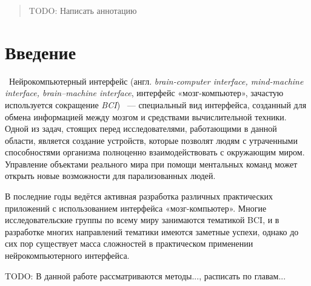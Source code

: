 \documentclass[12pt,fleqn]{article}
\begin{document}
\newpage
\renewcommand{\contentsname}{Содержание}
\tableofcontents

\newpage
\begin{abstract}
	TODO: Написать аннотацию

\end{abstract}

\newpage
\section{Введение}
	\quad\,\,\,Нейрокомпьютерный интерфейс (англ. {\it brain-computer interface, mind-machine interface, brain–machine interface}, интерфейс «мозг-компьютер», зачастую используется сокращение {\it BCI}) ~--- специальный вид интерфейса, созданный для обмена информацией между мозгом и средствами вычислительной техники. Одной из задач, стоящих перед исследователями, работающими в данной области, является создание устройств, которые позволят людям с утраченными способностями организма полноценно взаимодействовать с окружающим миром. Управление объектами реального мира при помощи ментальных команд может открыть новые возможности для парализованных людей. 
	\par В последние годы ведётся активная разработка различных практических приложений с использованием интерфейса «мозг-компьютер». Многие исследовательские группы по всему миру занимаются тематикой BCI, и в разработке многих направлений тематики имеются заметные успехи, однако до сих пор существует масса сложностей в практическом применении нейрокомпьютерного интерфейса.
	\par TODO: В данной работе рассматриваются методы..., расписать по главам...
\end{document}
